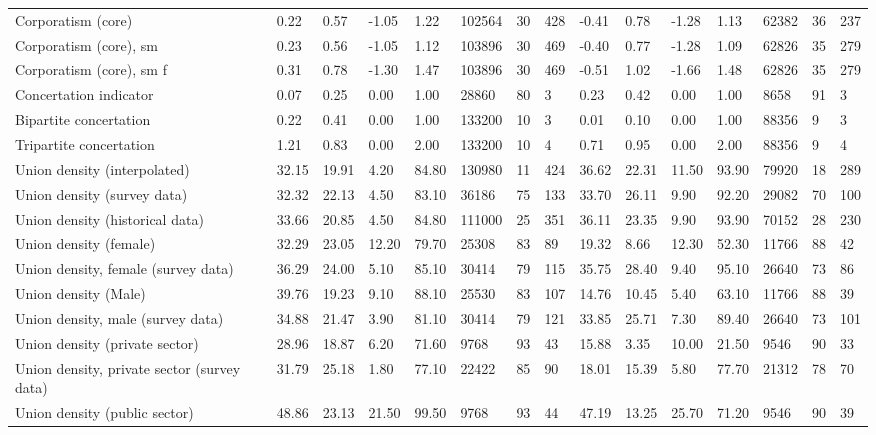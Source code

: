 \begin{longtable}{lllllllllllllll}
Corporatism (core) & 0.22 & 0.57 & -1.05 & 1.22 & 102564 & 30 & 428 & -0.41 & 0.78 & -1.28 & 1.13 & 62382 & 36 & 237\\
\addlinespace
Corporatism (core), sm & 0.23 & 0.56 & -1.05 & 1.12 & 103896 & 30 & 469 & -0.40 & 0.77 & -1.28 & 1.09 & 62826 & 35 & 279\\
Corporatism (core), sm f & 0.31 & 0.78 & -1.30 & 1.47 & 103896 & 30 & 469 & -0.51 & 1.02 & -1.66 & 1.48 & 62826 & 35 & 279\\
Concertation indicator & 0.07 & 0.25 & 0.00 & 1.00 & 28860 & 80 & 3 & 0.23 & 0.42 & 0.00 & 1.00 & 8658 & 91 & 3\\
Bipartite concertation & 0.22 & 0.41 & 0.00 & 1.00 & 133200 & 10 & 3 & 0.01 & 0.10 & 0.00 & 1.00 & 88356 & 9 & 3\\
Tripartite concertation & 1.21 & 0.83 & 0.00 & 2.00 & 133200 & 10 & 4 & 0.71 & 0.95 & 0.00 & 2.00 & 88356 & 9 & 4\\
\addlinespace
Union density (interpolated) & 32.15 & 19.91 & 4.20 & 84.80 & 130980 & 11 & 424 & 36.62 & 22.31 & 11.50 & 93.90 & 79920 & 18 & 289\\
Union density (survey data) & 32.32 & 22.13 & 4.50 & 83.10 & 36186 & 75 & 133 & 33.70 & 26.11 & 9.90 & 92.20 & 29082 & 70 & 100\\
Union density (historical data) & 33.66 & 20.85 & 4.50 & 84.80 & 111000 & 25 & 351 & 36.11 & 23.35 & 9.90 & 93.90 & 70152 & 28 & 230\\
Union density (female) & 32.29 & 23.05 & 12.20 & 79.70 & 25308 & 83 & 89 & 19.32 & 8.66 & 12.30 & 52.30 & 11766 & 88 & 42\\
Union density, female (survey data) & 36.29 & 24.00 & 5.10 & 85.10 & 30414 & 79 & 115 & 35.75 & 28.40 & 9.40 & 95.10 & 26640 & 73 & 86\\
\addlinespace
Union density (Male) & 39.76 & 19.23 & 9.10 & 88.10 & 25530 & 83 & 107 & 14.76 & 10.45 & 5.40 & 63.10 & 11766 & 88 & 39\\
Union density, male (survey data) & 34.88 & 21.47 & 3.90 & 81.10 & 30414 & 79 & 121 & 33.85 & 25.71 & 7.30 & 89.40 & 26640 & 73 & 101\\
Union density (private sector) & 28.96 & 18.87 & 6.20 & 71.60 & 9768 & 93 & 43 & 15.88 & 3.35 & 10.00 & 21.50 & 9546 & 90 & 33\\
Union density, private sector (survey data) & 31.79 & 25.18 & 1.80 & 77.10 & 22422 & 85 & 90 & 18.01 & 15.39 & 5.80 & 77.70 & 21312 & 78 & 70\\
Union density (public sector) & 48.86 & 23.13 & 21.50 & 99.50 & 9768 & 93 & 44 & 47.19 & 13.25 & 25.70 & 71.20 & 9546 & 90 & 39\\

\end{longtable}
